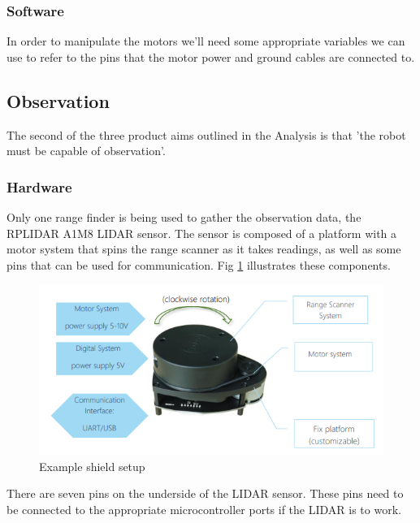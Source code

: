 				\subsubsection{Software}
				In order to manipulate the motors we'll need some appropriate variables we can use to refer to the pins that the motor power and ground cables are connected to. 

				
			\subsection{Observation}
			The second of the three product aims outlined in the Analysis is that 'the robot must be capable of observation'.
				\subsubsection{Hardware}
				Only one range finder is being used to gather the observation data, the RPLIDAR A1M8 LIDAR sensor. The sensor is composed of a platform with a motor system that spins the range scanner as it takes readings, as well as some pins that can be used for communication. Fig \ref{fig:rplidarconfig} illustrates these components.
				
				\begin{figure}[h]
					\centering
					\includegraphics[width=.9\linewidth]{SYNTHESIS/rplidar_configuration.png}
					\caption{Example shield setup}
					\label{fig:rplidarconfig}
				\end{figure}
			
				There are seven pins on the underside of the LIDAR sensor. These pins need to be connected to the appropriate microcontroller ports if the LIDAR is to work. 
				
